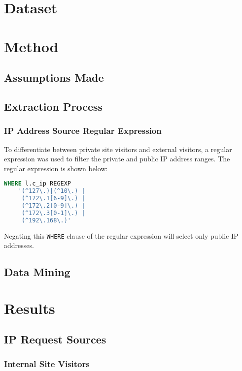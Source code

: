 \documentclass[12pt,titlepage]{article}
\begin{document}
\section{Dataset}

\section{Method}

\subsection{Assumptions Made}

\subsection{Extraction Process}

\subsubsection{IP Address Source Regular Expression}

To differentiate between private site visitors and external visitors, a regular expression was used to filter the private and public IP address ranges. The regular expression is shown below:

\begin{lstlisting}[language=SQL, xleftmargin=2cm]
WHERE l.c_ip REGEXP 
	'(^127\.)|(^10\.) | 
	 (^172\.1[6-9]\.) |
	 (^172\.2[0-9]\.) |
	 (^172\.3[0-1]\.) |
	 (^192\.168\.)'
\end{lstlisting}

Negating this \texttt{WHERE} clause of the regular expression will select only public IP addresses.

\subsection{Data Mining}

\section{Results}
\label{sec:results}

\subsection{IP Request Sources}

\subsubsection{Internal Site Visitors}
\end{document}
